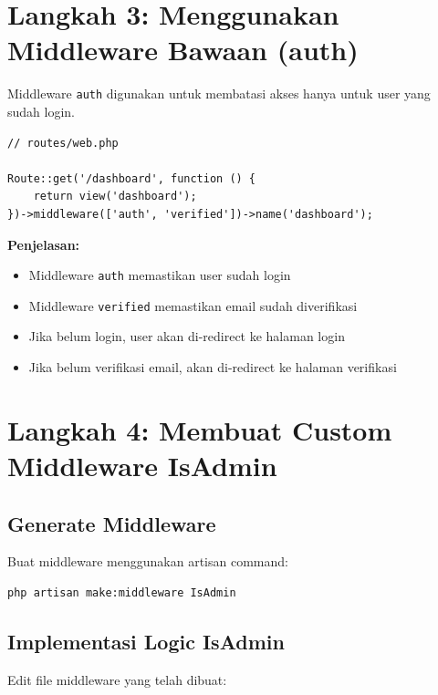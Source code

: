 \documentclass[a4paper,oneside,11pt]{book}
\begin{document}
\section{Langkah 3: Menggunakan Middleware Bawaan (auth)}

Middleware \texttt{auth} digunakan untuk membatasi akses hanya untuk user yang sudah login.

\begin{lstlisting}[style=phpstyle]
// routes/web.php

Route::get('/dashboard', function () {
    return view('dashboard');
})->middleware(['auth', 'verified'])->name('dashboard');
\end{lstlisting}

\textbf{Penjelasan:}
\begin{itemize}
    \item Middleware \texttt{auth} memastikan user sudah login
    \item Middleware \texttt{verified} memastikan email sudah diverifikasi
    \item Jika belum login, user akan di-redirect ke halaman login
    \item Jika belum verifikasi email, akan di-redirect ke halaman verifikasi
\end{itemize}

\section{Langkah 4: Membuat Custom Middleware IsAdmin}

\subsection{Generate Middleware}

Buat middleware menggunakan artisan command:

\begin{lstlisting}[language=bash]
php artisan make:middleware IsAdmin
\end{lstlisting}

\subsection{Implementasi Logic IsAdmin}

Edit file middleware yang telah dibuat:
\end{document}

